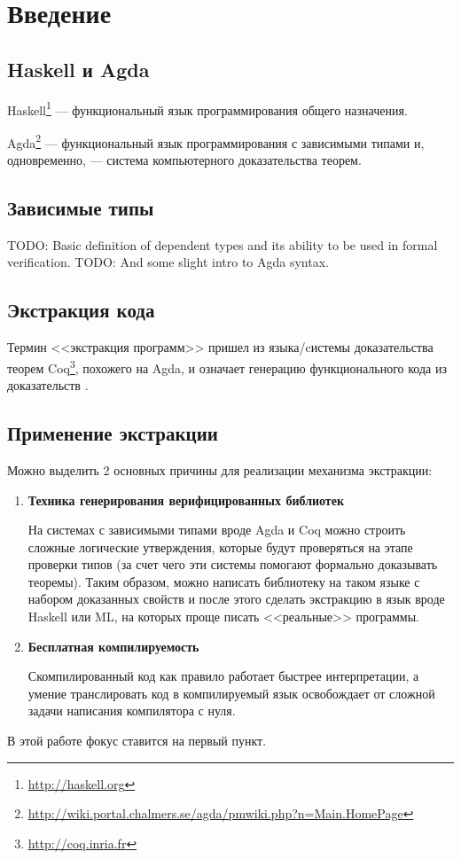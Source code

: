 \section{Введение}

\subsection{Haskell и Agda}

Haskell\footnote{\url{http://haskell.org}} --- функциональный язык программирования
общего назначения.

Agda\footnote{\url{http://wiki.portal.chalmers.se/agda/pmwiki.php?n=Main.HomePage}} ---
функциональный язык программирования с зависимыми типами и, одновременно, ---
система компьютерного доказательства теорем.

\subsection{Зависимые типы}

TODO: Basic definition of dependent types and its ability to be used in formal verification.
TODO: And some slight intro to Agda syntax.

\subsection{Экстракция кода}\label{sec:intro-extraction}

Термин <<экстракция программ>> пришел из языка/cистемы доказательства теорем
Coq\footnote{\url{http://coq.inria.fr}}, похожего на Agda, и означает генерацию
функционального кода из доказательств \cite{Let02}.

\subsection{Применение экстракции}

Можно выделить 2 основных причины для реализации механизма экстракции:
\begin{enumerate}
\item \textbf{Техника генерирования верифицированных библиотек}

      На системах с зависимыми типами вроде Agda и Coq можно строить
      сложные логические утверждения, которые будут проверяться на этапе
      проверки типов (за счет чего эти системы помогают формально доказывать теоремы).
      Таким образом, можно написать библиотеку на таком языке с набором доказанных
      свойств и после этого сделать экстракцию в язык вроде Haskell или ML,
      на которых проще писать <<реальные>> программы.

\item \textbf{Бесплатная компилируемость}

      Скомпилированный код как правило работает быстрее интерпретации, а умение
      транслировать код в компилируемый язык освобождает от сложной задачи
      написания компилятора с нуля.
\end{enumerate}

В этой работе фокус ставится на первый пункт.
